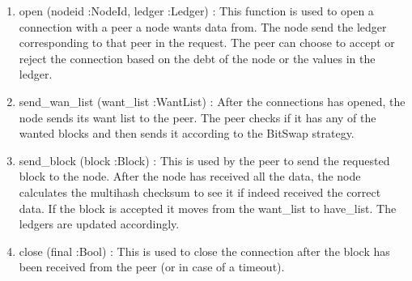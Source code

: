 \begin{enumerate}
    \item open (nodeid :NodeId, ledger :Ledger) : This function is used to open a connection with a peer a node wants data from. The node send the ledger corresponding to that peer in the request. The peer can choose to accept or reject the connection based on the debt of the node or the values in the ledger.
    \item send\_wan\_list (want\_list :WantList) : After the connections has opened, the node sends its want list to the peer. The peer checks if it has any of the wanted blocks and then sends it according to the BitSwap strategy.
    \item send\_block (block :Block) : This is used by the peer to send the requested block to the node. After the node has received all the data, the node calculates the multihash checksum to see it if indeed received the correct data. If the block is accepted it moves from the want\_list to have\_list. The ledgers are updated accordingly.
    \item close (final :Bool) : This is used to close the connection after the block has been received from the peer (or in case of a timeout).
\end{enumerate}